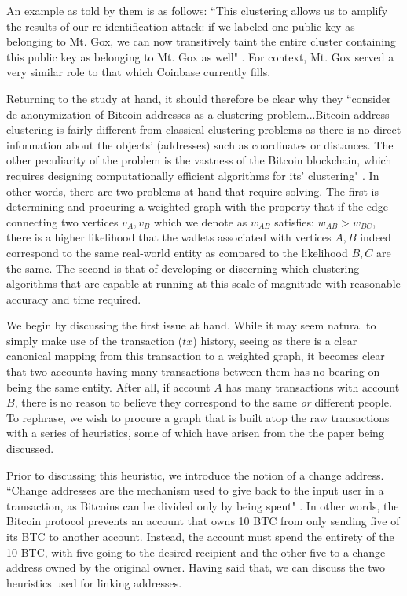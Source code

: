 \documentclass{article}
\begin{document}
An example as told by them is as follows: ``This clustering allows us to amplify the results of our re-identification attack: if we labeled one public key as belonging to Mt. Gox, we can now transitively taint the entire cluster containing this public key as belonging to Mt. Gox as well" \cite{fistful}. For context, Mt. Gox served a very similar role to that which Coinbase currently fills. 

Returning to the study at hand, it should therefore be clear why they ``consider de-anonymization of Bitcoin addresses as a clustering problem...Bitcoin address clustering is fairly different from classical clustering problems as there is no direct information about the objects' (addresses) such as coordinates or distances. The other peculiarity of the problem is the vastness of the Bitcoin blockchain, which requires designing computationally efficient algorithms for its' clustering" \cite{automatic}. In other words, there are two problems at hand that require solving. The first is determining and procuring a weighted graph with the property that if the edge connecting two vertices $v_{A},v_{B}$ which we denote as $w_{AB}$ satisfies: $w_{AB} > w_{BC}$, there is a higher likelihood that the wallets associated with vertices $A,B$ indeed correspond to the same real-world entity as compared to the likelihood $B,C$ are the same. The second is that of developing or discerning which clustering algorithms that are capable at running at this scale of magnitude with reasonable accuracy and time required.

We begin by discussing the first issue at hand. While it may seem natural to simply make use of the transaction ($tx$) history, seeing as there is a clear canonical mapping from this transaction to a weighted graph, it becomes clear that two accounts having many transactions between them has no bearing on being the same entity. After all, if account $A$ has many transactions with account $B$, there is no reason to believe they correspond to the same \textit{or} different people. To rephrase, we wish to procure a graph that is built atop the raw transactions with a series of heuristics, some of which have arisen from the the paper being discussed.

Prior to discussing this heuristic, we introduce the notion of a change address. ``Change addresses are the mechanism used to give back to the input user in a transaction, as Bitcoins can be divided only by being spent" \cite{fistful}. In other words, the Bitcoin protocol prevents an account that owns 10 BTC from only sending five of its BTC to another account. Instead, the account must spend the entirety of the 10 BTC, with five going to the desired recipient and the other five to a change address owned by the original owner. Having said that, we can discuss the two heuristics used for linking addresses.
\end{document}
